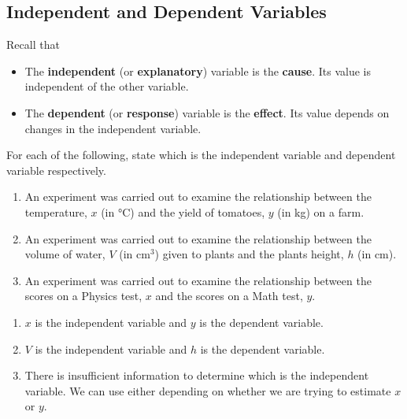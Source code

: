 \documentclass[11pt,a4paper]{book}
\begin{document}
\subsection{Independent and Dependent Variables}

Recall that
\begin{itemize}
\item The \textbf{independent} (or \textbf{explanatory}) variable is the
\textbf{cause}. Its value is independent of the other variable.
\item The \textbf{dependent} (or \textbf{response}) variable is the \textbf{effect}.
Its value depends on changes in the independent variable.
\end{itemize}

\begin{example}

For each of the following, state which is the independent variable
and dependent variable respectively.

\begin{enumerate}[label=(\alph*)]

\item An experiment was carried out to examine the relationship between
the temperature, $x$ (in $\text{°C}$) and the yield of tomatoes,
$y$ (in kg) on a farm.

\item An experiment was carried out to examine the relationship between
the volume of water, $V$ (in $\text{cm}^{3}$) given to plants and
the plants height, $h$ (in cm).

\item An experiment was carried out to examine the relationship between
the scores on a Physics test, $x$ and the scores on a Math test,
$y$.

\end{enumerate}

\Solution

\begin{enumerate}[label=(\alph*)]

\item  $x$ is the independent variable and $y$ is the dependent
variable.

\item  $V$ is the independent variable and $h$ is the dependent
variable.

\item  There is insufficient information to determine which is the
independent variable. We can use either depending on whether we are
trying to estimate $x$ or $y$.

\end{enumerate}
\end{example}
\end{document}
